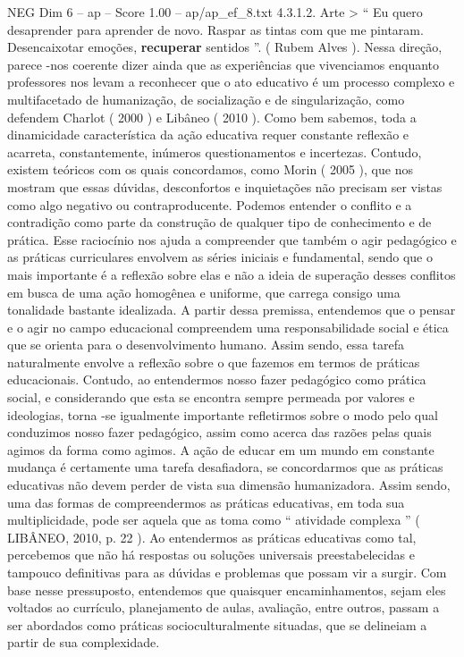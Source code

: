 \begin{textsample}{NEG Dim 6 – ap – Score 1.00 – ap/ap\_ef\_8.txt}  \label{ex:f6_neg_182}
4.3.1.2.
Arte > “ Eu quero desaprender para aprender de novo.
Raspar as tintas com que me pintaram.
Desencaixotar emoções, \textbf{recuperar} sentidos ”. ( Rubem Alves ).
Nessa direção, parece -nos coerente dizer ainda que as experiências que vivenciamos enquanto professores nos levam a reconhecer que o ato educativo é um processo complexo e multifacetado de humanização, de socialização e de singularização, como defendem Charlot ( 2000 ) e Libâneo ( 2010 ).
Como bem sabemos, toda a dinamicidade característica da ação educativa requer constante reflexão e acarreta, constantemente, inúmeros questionamentos e incertezas.
Contudo, existem teóricos com os quais concordamos, como Morin ( 2005 ), que nos mostram que essas dúvidas, desconfortos e inquietações não precisam ser vistas como algo negativo ou contraproducente.
Podemos entender o conflito e a contradição como parte da construção de qualquer tipo de conhecimento e de prática.
Esse raciocínio nos ajuda a compreender que também o agir pedagógico e as práticas curriculares envolvem as séries iniciais e fundamental, sendo que o mais importante é a reflexão sobre elas e não a ideia de superação desses conflitos em busca de uma ação homogênea e uniforme, que carrega consigo uma tonalidade bastante idealizada.
A partir dessa premissa, entendemos que o pensar e o agir no campo educacional compreendem uma responsabilidade social e ética que se orienta para o desenvolvimento humano.
Assim sendo, essa tarefa naturalmente envolve a reflexão sobre o que fazemos em termos de práticas educacionais.
Contudo, ao entendermos nosso fazer pedagógico como prática social, e considerando que esta se encontra sempre permeada por valores e ideologias, torna -se igualmente importante refletirmos sobre o modo pelo qual conduzimos nosso fazer pedagógico, assim como acerca das razões pelas quais agimos da forma como agimos.
A ação de educar em um mundo em constante mudança é certamente uma tarefa desafiadora, se concordarmos que as práticas educativas não devem perder de vista sua dimensão humanizadora.
Assim sendo, uma das formas de compreendermos as práticas educativas, em toda sua multiplicidade, pode ser aquela que as toma como “ atividade complexa ” ( LIBÂNEO, 2010, p. 22 ).
Ao entendermos as práticas educativas como tal, percebemos que não há respostas ou soluções universais preestabelecidas e tampouco definitivas para as dúvidas e problemas que possam vir a surgir.
Com base nesse pressuposto, entendemos que quaisquer encaminhamentos, sejam eles voltados ao currículo, planejamento de aulas, avaliação, entre outros, passam a ser abordados como práticas socioculturalmente situadas, que se delineiam a partir de sua complexidade.

\end{textsample}
